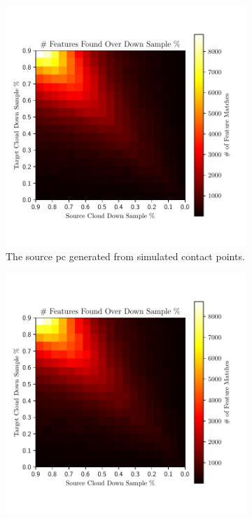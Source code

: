 \begin{figure}[!h]
	\centering
	\begin{subfigure}[b]{0.48\textwidth}
		\centering
		\includegraphics[width=\textwidth]{chapters/2-pose-estimation/fig/M.pdf}
		\caption{The source \gls{pc} generated from simulated contact points.\newline}
		\label{fig:pe-feature-filtered-pc}
	\end{subfigure}
	\begin{subfigure}[b]{0.48\textwidth}
		\centering
		\includegraphics[width=\textwidth]{chapters/2-pose-estimation/fig/M_unfiltered.pdf}

\end{subfigure}
\end{figure}
